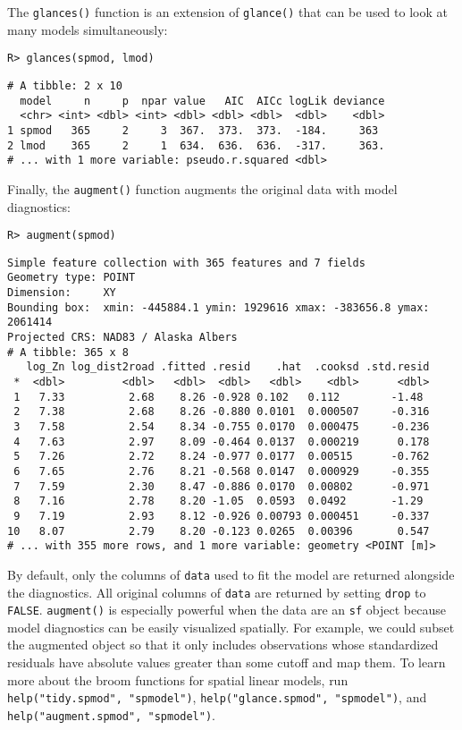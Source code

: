 \documentclass[10pt,letterpaper]{article}
\begin{document}
The \texttt{glances()} function is an extension of \texttt{glance()}
that can be used to look at many models simultaneously:

\begin{verbatim}
R> glances(spmod, lmod)
\end{verbatim}

\begin{verbatim}
# A tibble: 2 x 10
  model     n     p  npar value   AIC  AICc logLik deviance
  <chr> <int> <dbl> <int> <dbl> <dbl> <dbl>  <dbl>    <dbl>
1 spmod   365     2     3  367.  373.  373.  -184.     363 
2 lmod    365     2     1  634.  636.  636.  -317.     363.
# ... with 1 more variable: pseudo.r.squared <dbl>
\end{verbatim}

Finally, the \texttt{augment()} function augments the original data with
model diagnostics:

\begin{verbatim}
R> augment(spmod)
\end{verbatim}

\begin{verbatim}
Simple feature collection with 365 features and 7 fields
Geometry type: POINT
Dimension:     XY
Bounding box:  xmin: -445884.1 ymin: 1929616 xmax: -383656.8 ymax: 2061414
Projected CRS: NAD83 / Alaska Albers
# A tibble: 365 x 8
   log_Zn log_dist2road .fitted .resid    .hat  .cooksd .std.resid
 *  <dbl>         <dbl>   <dbl>  <dbl>   <dbl>    <dbl>      <dbl>
 1   7.33          2.68    8.26 -0.928 0.102   0.112        -1.48 
 2   7.38          2.68    8.26 -0.880 0.0101  0.000507     -0.316
 3   7.58          2.54    8.34 -0.755 0.0170  0.000475     -0.236
 4   7.63          2.97    8.09 -0.464 0.0137  0.000219      0.178
 5   7.26          2.72    8.24 -0.977 0.0177  0.00515      -0.762
 6   7.65          2.76    8.21 -0.568 0.0147  0.000929     -0.355
 7   7.59          2.30    8.47 -0.886 0.0170  0.00802      -0.971
 8   7.16          2.78    8.20 -1.05  0.0593  0.0492       -1.29 
 9   7.19          2.93    8.12 -0.926 0.00793 0.000451     -0.337
10   8.07          2.79    8.20 -0.123 0.0265  0.00396       0.547
# ... with 355 more rows, and 1 more variable: geometry <POINT [m]>
\end{verbatim}

By default, only the columns of \texttt{data} used to fit the model are
returned alongside the diagnostics. All original columns of
\texttt{data} are returned by setting \texttt{drop} to \texttt{FALSE}.
\texttt{augment()} is especially powerful when the data are an
\texttt{sf} object because model diagnostics can be easily visualized
spatially. For example, we could subset the augmented object so that it
only includes observations whose standardized residuals have absolute
values greater than some cutoff and map them. To learn more about the
broom functions for spatial linear models, run
\texttt{help("tidy.spmod",\ "spmodel")},
\texttt{help("glance.spmod",\ "spmodel")}, and
\texttt{help("augment.spmod",\ "spmodel")}.
\end{document}
